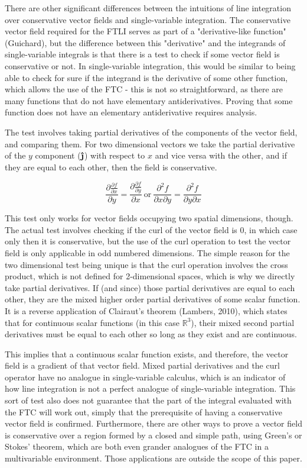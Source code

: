 \documentclass[11pt]{article}
\newcommand{\jhat}{\boldsymbol{\hat{\textbf{\j}}}}
\begin{document}
There are other significant differences between the intuitions of line integration over conservative vector fields and single-variable integration. The conservative vector field required for the FTLI serves as part of a "derivative-like function" (Guichard), but the difference between this "derivative" and the integrands of single-variable integrals is that there is a test to check if some vector field is conservative or not. In single-variable integration, this would be similar to being able to check for sure if the integrand is the derivative of some other function, which allows the use of the FTC - this is not so straightforward, as there are many functions that do not have elementary antiderivatives. Proving that some function does not have an elementary antiderivative requires analysis.

The test involves taking partial derivatives of the components of the vector field, and comparing them. For two dimensional vectors we take the partial derivative of the $y$ component ($\jhat$) with respect to $x$ and vice versa with the other, and if they are equal to each other, then the field is conservative.

$$\frac{\partial \frac{\partial f}{\partial x}}{\partial y}=\frac{\partial \frac{\partial f}{\partial y}}{\partial x}~\text{or}~\frac{\partial^2f}{\partial x\partial y}=\frac{\partial^2f}{\partial y\partial x}$$

This test only works for vector fields occupying two spatial dimensions, though. The actual test involves checking if the curl of the vector field is $0$, in which case only then it is conservative, but the use of the curl operation to test the vector field is only applicable in odd numbered dimensions. %
The simple reason for the two dimensional test being unique is that the curl operation involves the cross product, which is not defined for 2-dimensional spaces, which is why we directly take partial derivatives. If (and since) those partial derivatives are equal to each other, they are the mixed higher order partial derivatives of some scalar function. It is a reverse application of Clairaut's theorem (Lambers, 2010), which states that for continuous scalar functions (in this case $\mathbb{R}^3$), their mixed second partial derivatives must be equal to each other so long as they exist and are continuous.

This implies that a continuous scalar function exists, and therefore, the vector field is a gradient of that vector field. Mixed partial derivatives and the curl operator have no analogue in single-variable calculus, which is an indicator of how line integration is not a perfect analogue of single-variable integration. This sort of test also does not guarantee that the part of the integral evaluated with the FTC will work out, simply that the prerequisite of having a conservative vector field is confirmed. Furthermore, there are other ways to prove a vector field is conservative over a region formed by a closed and simple path, using Green's or Stokes' theorem, which are both even grander analogues of the FTC in a multivariable environment. Those applications are outside the scope of this paper.
\end{document}
